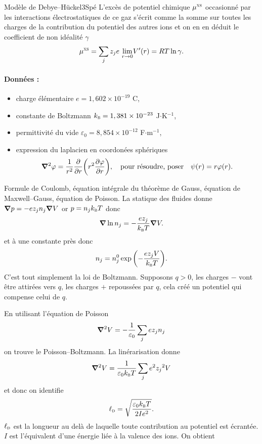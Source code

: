\begin{exercise}{Modèle de Debye--Hückel}{3}{Spé}
L'excès de potentiel chimique $\mu^\textsc{xs}$ occasionné par les interactions électrostatiques de ce gaz s'écrit comme la somme sur toutes les charges de la contribution du potentiel des autres ions et on en en déduit le coefficient de non idéalité $\gamma$
$$\mu^\textsc{xs} = \sum_j z_j e\ \underset{r\rightarrow 0}{\lim}V'(r) = RT\ln\gamma.$$

\paragraph{Données :}
\begin{itemize}
    \item charge élémentaire $e = 1,602\times 10^{-19}$ C,
    \item constante de Boltzmann $k_\textsc{b} = 1,381\times 10^{-23}$ J$\cdot$K$^{-1}$,
    \item permittivité du vide $\varepsilon_0 = 8,854\times 10^{-12}$ F$\cdot$m$^{-1}$,
    \item expression du laplacien en coordonées sphériques
    $$\grad^2\varphi = \dfrac{1}{r^2}\pdv{}{r}\qty(r^2 \pdv{\varphi}{r}), \qqtext{pour résoudre, poser} \psi(r) = r \varphi(r).$$
\end{itemize}

\end{exercise}

\begin{solution}
\begin{questions}
    \questioncours Formule de Coulomb, équation intégrale du théorème de Gauss, équation de Maxwell--Gauss, équation de Poisson.
    \question La statique des fluides donne $\grad p = -ez_j n_j\grad{V}$ or $p = n_jk_\textsc{b}T$ donc
    $$\grad\ln n_j = -\dfrac{ez_j}{k_\textsc{b}T}\grad V.$$
    et à une constante près donc
    $$n_j = n_j^0 \exp\qty(-\dfrac{ez_jV}{k_\textsc{b}T}).$$
    C'est tout simplement la loi de Boltzmann.
    \question Supposons $q>0$, les charges $-$ vont être attirées vers $q$, les charges $+$ repoussées par $q$, cela créé un potentiel qui compense celui de $q$.
    
    En utilisant l'équation de Poisson
    $$\grad^2 V = -\dfrac{1}{\varepsilon_0}\sum_j e z_j n_j$$
    on trouve le Poisson--Boltzmann.
    \question La linérarisation donne
    $$\grad^2 V = \dfrac{1}{\varepsilon_0 k_\textsc{b} T}\sum_j e^2 {z_j}^2 V$$
    et donc on identifie
    $$\ell_\textsc{d} = \sqrt{\dfrac{\varepsilon_0k_\textsc{b}T}{2I e^2}}.$$
    $\ell_\textsc{d}$ est la longueur au delà de laquelle toute contribution au potentiel est écrantée. $I$ est l'équivalent d'une énergie liée à la valence des ions.
    \question On obtient
\end{questions}
\end{solution}